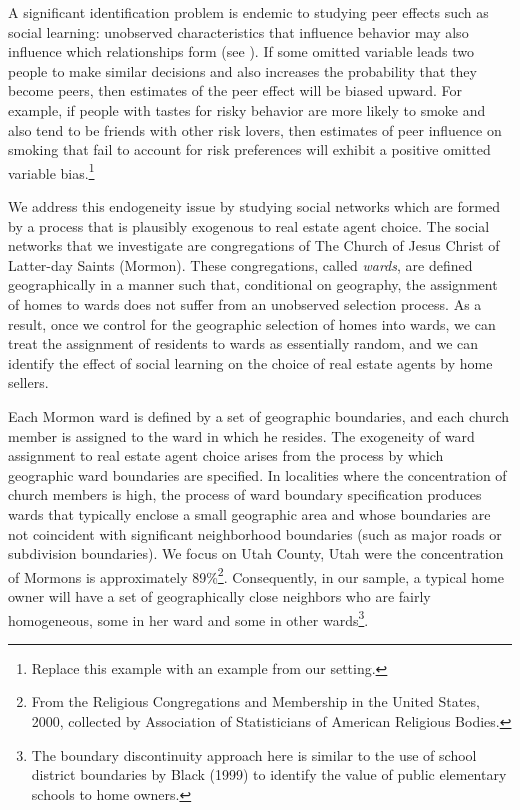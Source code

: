 \documentclass[12pt]{article}
\begin{document}
    A significant identification problem is endemic to studying peer effects such as social learning: unobserved characteristics that influence behavior may also influence which relationships
    form (see ). If some omitted variable leads two people to make similar
    decisions and also increases the probability that they become peers, then estimates of the peer effect will be biased upward. For example, if people with tastes for risky behavior are more likely to smoke and also tend to be friends with other risk lovers, then estimates of peer
    influence on smoking that fail to account for risk preferences will exhibit a positive omitted variable bias.\footnote{Replace this example with an example from our setting.}

    We address this endogeneity issue by studying social networks which are formed by a process that is plausibly exogenous to real estate agent choice. The social networks that we investigate are congregations of The Church of Jesus Christ of Latter-day
    Saints (Mormon). These congregations, called \emph{wards}, are defined geographically in a manner such that, conditional on geography, the
    assignment of homes to wards does not suffer from an unobserved selection process. As a result, once we control for the geographic selection of
    homes into wards, we can treat the assignment of residents to wards as essentially random, and we can identify the effect of social learning on
    the choice of real estate agents by home sellers.

    Each Mormon ward is defined by a set of geographic boundaries, and each church member is assigned to the ward in which he resides. The
    exogeneity of ward assignment to real estate agent choice arises from the process by which geographic ward boundaries are specified. In
    localities where the concentration of church members is high, the process of ward boundary specification produces wards that typically enclose
    a small geographic area and whose boundaries are not coincident with significant neighborhood boundaries (such as major roads or subdivision
    boundaries).  We focus on Utah County, Utah were the concentration of Mormons is approximately 89\%\footnote{From the Religious Congregations and
    Membership in the United States, 2000, collected by Association of Statisticians of American Religious Bodies.}. Consequently, in our sample, a
    typical home owner will have a set of geographically close neighbors who are fairly homogeneous, some in her ward and some in other wards\footnote{The boundary discontinuity approach here is similar to the use of school district boundaries by Black (1999) to identify the
    value of public elementary schools to home owners.}.
\end{document}
